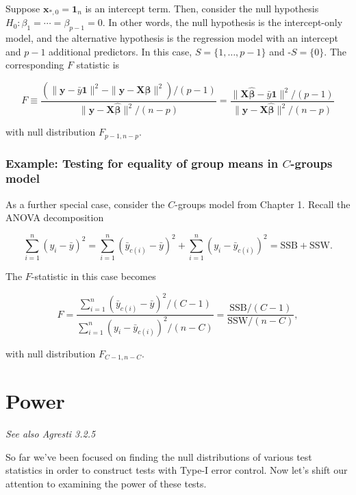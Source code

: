\documentclass[
  11pt,
  letterpaper,
  oneside]{book}
\theoremstyle{plain}
\theoremstyle{plain}
\theoremstyle{definition}
\theoremstyle{definition}
\theoremstyle{plain}
\theoremstyle{remark}
\begin{document}
Suppose \(\boldsymbol{x}_{*,0} = \boldsymbol{1}_n\) is an intercept
term. Then, consider the null hypothesis
\(H_0: \beta_1 = \cdots = \beta_{p-1} = 0\). In other words, the null
hypothesis is the intercept-only model, and the alternative hypothesis
is the regression model with an intercept and \(p-1\) additional
predictors. In this case, \(S = \{1, \dots, p-1\}\) and
\(\text{-}S = \{0\}\). The corresponding \(F\) statistic is

\[
F \equiv \frac{(\|\boldsymbol{y} - \bar{y} \boldsymbol{1}\|^2 - \|\boldsymbol{y} - \boldsymbol{X} \boldsymbol{\widehat{\beta}}\|^2)/(p-1)}{\|\boldsymbol{y} - \boldsymbol{X} \boldsymbol{\widehat{\beta}}\|^2/(n-p)} = \frac{\|\boldsymbol{X} \boldsymbol{\widehat{\beta}} - \bar{y} \boldsymbol{1}\|^2/(p-1)}{\|\boldsymbol{y} - \boldsymbol{X} \boldsymbol{\widehat{\beta}}\|^2/(n-p)}
\]

with null distribution \(F_{p-1, n-p}\).

\hypertarget{example-testing-for-equality-of-group-means-in-c-groups-model}{%
\subsection{\texorpdfstring{Example: Testing for equality of group means
in \(C\)-groups
model}{Example: Testing for equality of group means in C-groups model}}\label{example-testing-for-equality-of-group-means-in-c-groups-model}}

As a further special case, consider the \(C\)-groups model from Chapter
1. Recall the ANOVA decomposition

\[
\sum_{i = 1}^n (y_i - \bar{y})^2 = \sum_{i = 1}^n (\bar{y}_{c(i)} - \bar{y})^2 + \sum_{i = 1}^n (y_i - \bar{y}_{c(i)})^2 = \text{SSB} + \text{SSW}.
\]

The \(F\)-statistic in this case becomes

\[
F = \frac{\sum_{i = 1}^n (\bar{y}_{c(i)} - \bar{y})^2/(C-1)}{\sum_{i = 1}^n (y_i - \bar{y}_{c(i)})^2/(n-C)} = \frac{\text{SSB}/(C-1)}{\text{SSW}/(n-C)},
\]

with null distribution \(F_{C-1, n-C}\).

\hypertarget{sec-power}{%
\chapter{Power}\label{sec-power}}

\emph{See also Agresti 3.2.5}

So far we've been focused on finding the null distributions of various
test statistics in order to construct tests with Type-I error control.
Now let's shift our attention to examining the power of these tests.
\end{document}
